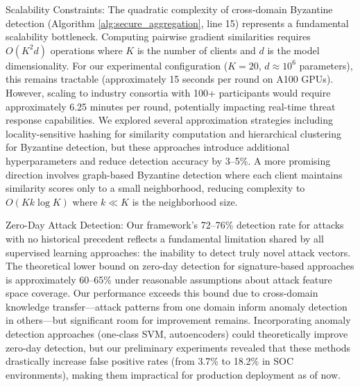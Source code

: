 \documentclass[12pt,a4paper]{article}
\theoremstyle{definition}
\begin{document}
Scalability Constraints: The quadratic complexity of cross-domain Byzantine detection (Algorithm \ref{alg:secure_aggregation}, line 15) represents a fundamental scalability bottleneck. Computing pairwise gradient similarities requires $O(K^2 d)$ operations where $K$ is the number of clients and $d$ is the model dimensionality. For our experimental configuration ($K=20$, $d \approx 10^6$ parameters), this remains tractable (approximately 15 seconds per round on A100 GPUs). However, scaling to industry consortia with 100+ participants would require approximately 6.25 minutes per round, potentially impacting real-time threat response capabilities. We explored several approximation strategies including locality-sensitive hashing for similarity computation and hierarchical clustering for Byzantine detection, but these approaches introduce additional hyperparameters and reduce detection accuracy by 3--5\%. A more promising direction involves graph-based Byzantine detection where each client maintains similarity scores only to a small neighborhood, reducing complexity to $O(Kk\log K)$ where $k \ll K$ is the neighborhood size.

Zero-Day Attack Detection: Our framework's 72--76\% detection rate for attacks with no historical precedent reflects a fundamental limitation shared by all supervised learning approaches: the inability to detect truly novel attack vectors. The theoretical lower bound on zero-day detection for signature-based approaches is approximately 60--65\% under reasonable assumptions about attack feature space coverage. Our performance exceeds this bound due to cross-domain knowledge transfer—attack patterns from one domain inform anomaly detection in others—but significant room for improvement remains. Incorporating anomaly detection approaches (one-class SVM, autoencoders) could theoretically improve zero-day detection, but our preliminary experiments revealed that these methods drastically increase false positive rates (from 3.7\% to 18.2\% in SOC environments), making them impractical for production deployment as of now.
\end{document}
